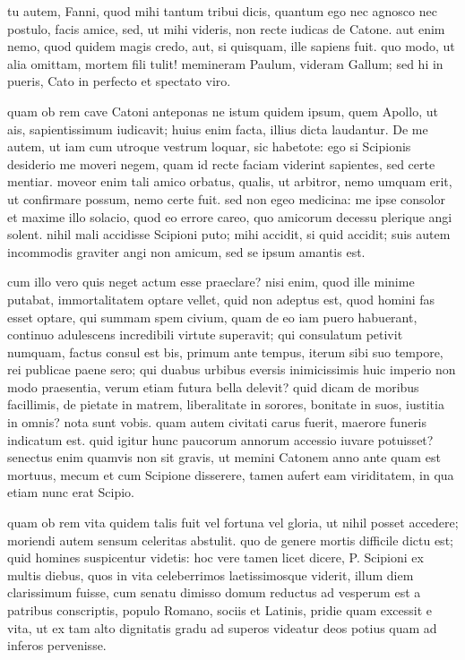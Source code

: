  tu autem, Fanni, quod mihi tantum tribui dicis, quantum ego nec agnosco nec postulo, facis amice, sed, ut mihi videris, non recte iudicas de Catone. aut enim nemo, quod quidem magis credo, aut, si quisquam, ille sapiens fuit. quo modo, ut alia omittam, mortem fili tulit! memineram Paulum, videram Gallum; sed hi in pueris, Cato in perfecto et spectato viro.

 quam ob rem cave Catoni anteponas ne istum quidem ipsum, quem Apollo, ut ais, sapientissimum iudicavit; huius enim facta, illius dicta laudantur. De me autem, ut iam cum utroque vestrum loquar, sic habetote: ego si Scipionis desiderio me moveri negem, quam id recte faciam viderint sapientes, sed certe mentiar. moveor enim tali amico orbatus, qualis, ut arbitror, nemo umquam erit, ut confirmare possum, nemo certe fuit. sed non egeo medicina: me ipse consolor et maxime illo solacio, quod eo errore careo, quo amicorum decessu plerique angi solent. nihil mali accidisse Scipioni puto; mihi accidit, si quid accidit; suis autem incommodis graviter angi non amicum, sed se ipsum amantis est.

 cum illo vero quis neget actum esse praeclare? nisi enim, quod ille minime putabat, immortalitatem optare vellet, quid non adeptus est, quod homini fas esset optare, qui summam spem civium, quam de eo iam puero habuerant, continuo adulescens incredibili virtute superavit; qui consulatum petivit numquam, factus consul est bis, primum ante tempus, iterum sibi suo tempore, rei publicae paene sero; qui duabus urbibus eversis inimicissimis huic imperio non modo praesentia, verum etiam futura bella delevit? quid dicam de moribus facillimis, de pietate in matrem, liberalitate in sorores, bonitate in suos, iustitia in omnis? nota sunt vobis. quam autem civitati carus fuerit, maerore funeris indicatum est. quid igitur hunc paucorum annorum accessio iuvare potuisset? senectus enim quamvis non sit gravis, ut memini Catonem anno ante quam est mortuus, mecum et cum Scipione disserere, tamen aufert eam viriditatem, in qua etiam nunc erat Scipio.

 quam ob rem vita quidem talis fuit vel fortuna vel gloria, ut nihil posset accedere; moriendi autem sensum celeritas abstulit. quo de genere mortis difficile dictu est; quid homines suspicentur videtis: hoc vere tamen licet dicere, P. Scipioni ex multis diebus, quos in vita celeberrimos laetissimosque viderit, illum diem clarissimum fuisse, cum senatu dimisso domum reductus ad vesperum est a patribus conscriptis, populo Romano, sociis et Latinis, pridie quam excessit e vita, ut ex tam alto dignitatis gradu ad superos videatur deos potius quam ad inferos pervenisse.

